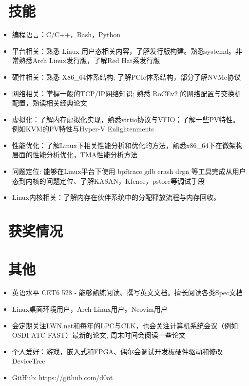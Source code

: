 \documentclass{resume}
\begin{document}
\section{\faCogs\ 技能}
\begin{itemize}[parsep=0.5ex]
  \item 编程语言：C/C++，Bash，Python
  \item 平台相关：熟悉 Linux 用户态相关内容，了解发行版构建。熟悉systemd。非常熟悉Arch Linux发行版，了解Red Hat系发行版
  \item 硬件相关：熟悉 X86\_64体系结构; 了解PCIe体系结构，部分了解NVMe协议
  \item 网络相关：掌握一般的TCP/IP网络知识; 熟悉 RoCEv2 的网络配置与交换机配置，熟读相关经典论文
  \item 虚拟化：了解内存虚拟化实现，熟悉virtio协议与VFIO；了解一些PV特性。例如KVM的PV特性与Hyper-V Enlightenments
  \item 性能优化：了解Linux下相关性能分析和优化的方法，熟悉x86\_64下在微架构层面的性能分析优化，TMA性能分析方法
  \item 问题定位: 能够在Linux平台下使用 bpftrace gdb crash drgn 等工具完成从用户态到内核的问题定位、了解KASAN，Kfence，pstore等调试手段
  \item Linux内核相关：了解内存在伙伴系统中的分配释放流程与内存回收。
\end{itemize}


\section{\faHeartO\ 获奖情况}


\section{\faInfo\ 其他}
\begin{itemize}[parsep=0.5ex]
  \item 英语水平 CET6 528 - 能够熟练阅读、撰写英文文档。擅长阅读各类Spec文档
  \item Linux桌面环境用户，Arch Linux用户。Neovim用户
  \item 会定期关注LWN.net和每年的LPC与CLK，也会关注计算机系统会议（例如OSDI ATC FAST）最新的论文, 周末时间会阅读一些论文
  \item 个人爱好：游戏，嵌入式和FPGA、偶尔会调试开发板硬件驱动和修改DeviceTree
  \item GitHub: https://github.com/d0ot

\end{itemize}

%
%
\end{document}
